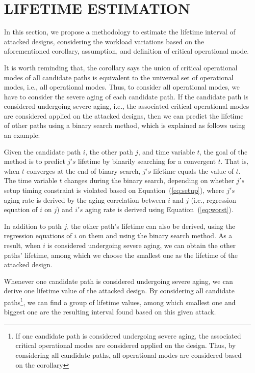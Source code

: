 
\section{LIFETIME ESTIMATION}
\label{sec:lt_estimation}
In this section, we propose a methodology to estimate the lifetime interval of attacked designs, considering the workload variations based on the aforementioned corollary, assumption, and definition of critical operational mode.

It is worth reminding that, the corollary says the union of critical operational modes of all candidate paths is equivalent to the universal set of operational modes, i.e., all operational modes. Thus, to consider all operational modes, we have to consider the severe aging of each candidate path. If the candidate path is considered undergoing severe aging, i.e., the associated critical operational modes are considered applied on the attacked designs, then we can predict the lifetime of other paths using a binary search method, which is explained as follows using an example:

Given the candidate path $i$, the other path $j$, and time variable $t$, the goal of the method is to predict $j's$ lifetime by binarily searching for a convergent $t$. That is, when $t$ converges at the end of binary search, $j's$ lifetime equals the value of $t$. The time variable $t$ changes during the binary search, depending on whether $j's$ setup timing constraint is violated based on Equation~(\ref{eq:setup}), where $j's$ aging rate is derived by the aging correlation between $i$ and $j$ (i.e., regression equation of $i$ on $j$) and $i's$ aging rate is derived using Equation~(\ref{eq:worst}). 

In addition to path $j$, the other path's lifetime can also be derived, using the regression equations of $i$ on them and using the binary search method. As a result, when $i$ is considered undergoing severe aging, we can obtain the other paths' lifetime, among which we choose the smallest one as the lifetime of the attacked design.

Whenever one candidate path is considered undergoing severe aging, we can derive one lifetime value of the attacked design. By considering all candidate paths\footnote{If one candidate path is considered undergoing severe aging, the associated critical operational modes are considered applied on the design. Thus, by considering all candidate paths, all operational modes are considered based on the corollary}, we can find a group of lifetime values, among which smallest one and biggest one are the resulting interval found based on this given attack.


  
